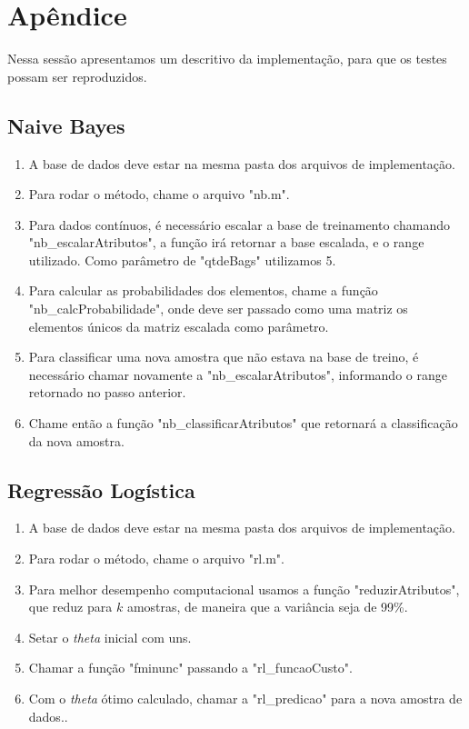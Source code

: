 \documentclass[10pt, conference, compsocconf]{IEEEtran}
\begin{document}


\newpage
\section{Apêndice}
Nessa sessão apresentamos um descritivo da implementação, para que os testes possam ser reproduzidos.

\subsection{Naive Bayes}
\begin{enumerate}
\item A base de dados deve estar na mesma pasta dos arquivos de implementação.
\item Para rodar o método, chame o arquivo "nb.m".
\item Para dados contínuos, é necessário escalar a base de treinamento chamando "nb\_escalarAtributos", a função irá retornar a base escalada, e o range utilizado. Como parâmetro de "qtdeBags" utilizamos 5.
\item Para calcular as probabilidades dos elementos, chame a função "nb\_calcProbabilidade", onde deve ser passado como uma matriz os elementos únicos da matriz escalada como parâmetro.
\item Para classificar uma nova amostra que não estava na base de treino, é necessário chamar novamente a "nb\_escalarAtributos", informando o range retornado no passo anterior.
\item Chame então a função "nb\_classificarAtributos" que retornará a classificação da nova amostra.
\end{enumerate}

\subsection{Regressão Logística}
\begin{enumerate}
\item A base de dados deve estar na mesma pasta dos arquivos de implementação.
\item Para rodar o método, chame o arquivo "rl.m".
\item Para melhor desempenho computacional usamos a função "reduzirAtributos", que reduz para $k$ amostras, de maneira que a variância seja de 99\%.
\item Setar o \textit{theta} inicial com uns.
\item Chamar a função "fminunc" passando a "rl\_funcaoCusto".
\item Com o \textit{theta} ótimo calculado, chamar a "rl\_predicao" para a nova amostra de dados..
\end{enumerate}
\end{document}
